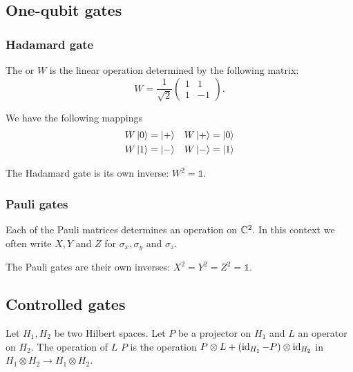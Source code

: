 \subsection{One-qubit gates}
\subsubsection{Hadamard gate}
\begin{definition}
The  or  $W$ is the linear operation determined by the following matrix:
\[ W = \frac{1}{\sqrt{2}}\begin{pmatrix}
1 & 1 \\ 1 & -1
\end{pmatrix}. \]
\end{definition}
We have the following mappings
\begin{align*}
W\left| 0 \right\rangle &= \left| + \right\rangle & W\left| + \right\rangle &= \left| 0 \right\rangle \\
W\left| 1 \right\rangle &= \left| - \right\rangle & W\left| - \right\rangle &= \left| 1 \right\rangle
\end{align*}

\begin{lemma}
The Hadamard gate is its own inverse: $W^2 = \mathbb{1}$.
\end{lemma}

\subsubsection{Pauli gates}
\begin{definition}
Each of the Pauli matrices determines an operation on $\mathbb{C}^2$. In this context we often write $X,Y$ and $Z$ for $\sigma_x, \sigma_y$ and $\sigma_z$.
\end{definition}

\begin{lemma}
The Pauli gates are their own inverses: $X^2 = Y^2 = Z^2 = \mathbb{1}$.
\end{lemma}



\subsection{Controlled gates}
\begin{definition}
Let $H_1, H_2$ be two Hilbert spaces. Let $P$ be a projector on $H_1$ and $L$ an operator on $H_2$. The operation of $L$  $P$ is the operation $P\otimes L + (\operatorname{id}_{H_1} - P)\otimes \operatorname{id}_{H_2}$ in $H_1\otimes H_2 \to H_1\otimes H_2$. 
\end{definition}

